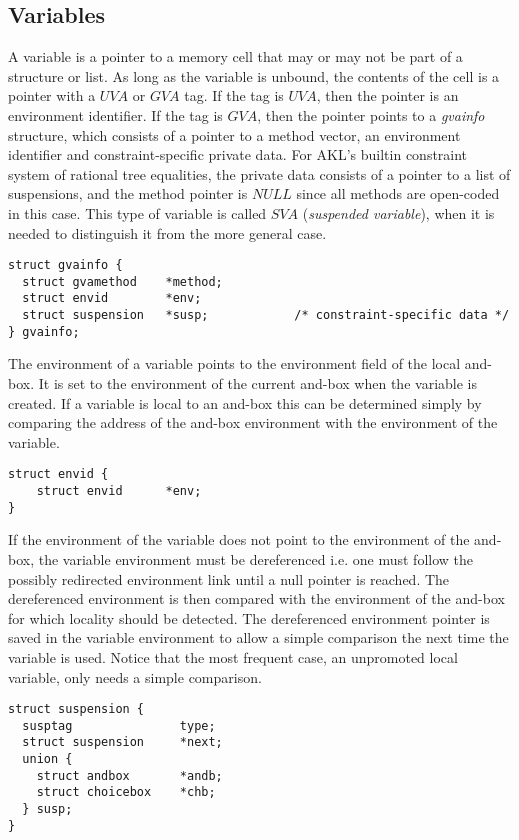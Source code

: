 \subsection*{Variables}

A variable is a pointer to a memory cell that may or may not be part of a
structure or list. As long as the variable is unbound, the contents of
the cell is a pointer with a $UVA$ or $GVA$ tag. If the tag is $UVA$, then
the pointer is an environment identifier. If the tag is $GVA$, then the
pointer points to a {\em gvainfo} structure, which consists of a pointer
to a method vector, an environment identifier and constraint-specific private
data. For AKL's builtin constraint system of rational tree equalities,
the private data consists of a pointer to a list of suspensions, and the
method pointer is $NULL$ since all methods are open-coded in this case.
This type of variable is called $SVA$ ({\em suspended variable}), when it
is needed to distinguish it from the more general case.

\begin{verbatim}
struct gvainfo {
  struct gvamethod    *method;
  struct envid        *env;
  struct suspension   *susp;            /* constraint-specific data */
} gvainfo;
\end{verbatim}

The environment of a variable points to the environment field of the
local and-box. It is set to the environment of the current and-box
when the variable is created. If a variable is local to an and-box
this can be determined simply by comparing the address of the and-box
environment with the environment of the variable.

\begin{verbatim}
struct envid {
    struct envid      *env;
}
\end{verbatim}

If the environment of the variable does not point to the environment
of the and-box, the variable environment must be dereferenced i.e.
one must follow the possibly redirected environment link until a null pointer
is reached. The dereferenced environment is then compared with the
environment of the and-box for which locality should be detected. The
dereferenced environment pointer is saved in the variable environment
to allow a simple comparison the next time the variable is used.
Notice that the most frequent case, an unpromoted local variable,
only needs a simple comparison.

\begin{verbatim}
struct suspension {
  susptag               type;
  struct suspension     *next;
  union {
    struct andbox       *andb;
    struct choicebox    *chb;
  } susp;
}
\end{verbatim}

